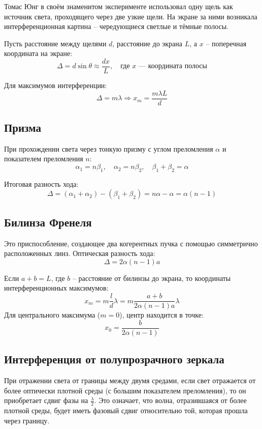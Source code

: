 \documentclass[12pt]{article}
\begin{document}
Томас Юнг в своём знаменитом эксперименте использовал одну щель как источник света, проходящего через две узкие щели. На экране за ними возникала интерференционная картина -- чередующиеся светлые и тёмные полосы.

Пусть расстояние между щелями $d$, расстояние до экрана $L$, а $x$ -- поперечная координата на экране:
\[
\Delta = d \sin \theta \approx \frac{d x}{L}, \quad \text{где } x \text{ --- координата полосы}
\]

Для максимумов интерференции:
\[
\Delta = m\lambda \Rightarrow x_m = \frac{m\lambda L}{d}
\]

\subsection{Призма}

При прохождении света через тонкую призму с углом преломления $\alpha$ и показателем преломления $n$:
\[
\alpha_1 = n\beta_1, \quad \alpha_2 = n\beta_2, \quad \beta_1 + \beta_2 = \alpha
\]

Итоговая разность хода:
\[
\Delta = (\alpha_1 + \alpha_2) - (\beta_1 + \beta_2) = n\alpha - \alpha = \alpha(n - 1)
\]

\subsection{Билинза Френеля}

Это приспособление, создающее два когерентных пучка с помощью симметрично расположенных линз. Оптическая разность хода:
\[
\Delta = 2\alpha(n - 1)a
\]

Если $a + b = L$, где $b$ -- расстояние от билинзы до экрана, то координаты интерференционных максимумов:
\[
x_m = m \frac{l}{d} \lambda = m \frac{a + b}{2 \alpha (n - 1) a} \lambda
\]
Для центрального максимума ($m = 0$), центр находится в точке:
\[
x_0 = \frac{b}{2 \alpha (n - 1)}
\]


\subsection{Интерференция от полупрозрачного зеркала}

При отражении света от границы между двумя средами, если свет отражается от более оптически плотной среды (с большим показателем преломления), то он приобретает сдвиг фазы на $\frac{\lambda}{2}$. Это означает, что волна, отразившаяся от более плотной среды, будет иметь фазовый сдвиг относительно той, которая прошла через границу.
\end{document}
